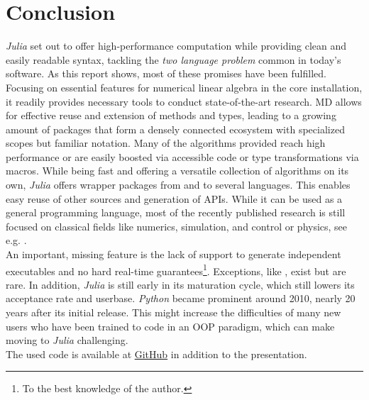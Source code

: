 \section{Conclusion}
\label{JM:sec:CONC}

\textit{Julia} set out to offer high-performance computation while providing clean and easily readable syntax, tackling the \textit{two language problem} common 
in today's software. As this report shows, most of these promises have been fulfilled. Focusing on essential features for numerical linear algebra in the core installation, it readily provides necessary 
tools to conduct state-of-the-art research. MD allows for effective reuse and extension of methods and types, leading to a growing amount of 
packages that form a densely connected ecosystem with specialized scopes but familiar notation. 
Many of the algorithms provided reach high performance or are easily boosted via accessible code or type transformations via macros. While being fast and offering a versatile collection of algorithms on its own, \textit{Julia} offers wrapper packages from and to 
several languages. This enables easy reuse of other sources and generation of APIs. 
While it can be used as a general programming language, most of the recently published research is still focused on classical 
fields like numerics, simulation, and control or physics, see e.g. \cite{JMJarlebring2019, JMForetsEtAl2020, JMKalubaEtAl2021}.\\

An important, missing feature is the lack of support to generate independent executables and no hard real-time guarantees\footnote{To the best knowledge of the author.}. Exceptions, like \cite{JMKoolenDeits2019}, exist but are rare.
In addition, \textit{Julia} is still early in its maturation cycle, which still lowers its acceptance rate and userbase. \textit{Python} became prominent around 2010, nearly 20 years after its initial release. 
This might increase the difficulties of many new users who have been trained to code in an OOP paradigm, which can make moving to \textit{Julia} challenging.\\

The used code is available at \href{https://github.com/AlCap23/ScientificComputingSeminar2021}{GitHub} in addition to the presentation.







